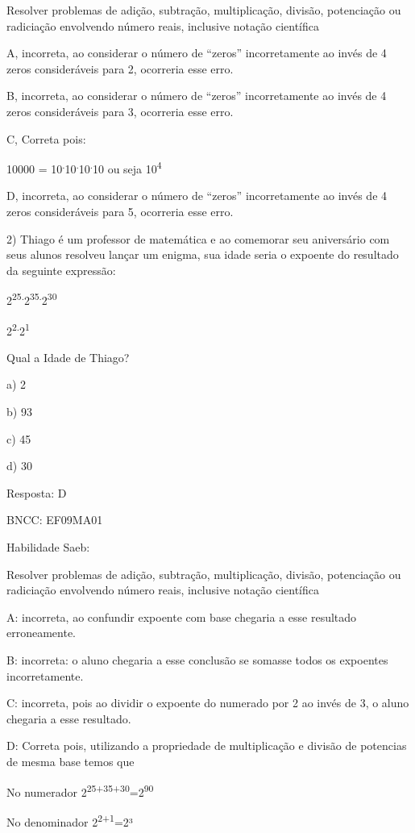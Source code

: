 Resolver problemas de adição, subtração, multiplicação, divisão,
potenciação ou radiciação envolvendo número reais, inclusive notação
científica

A, incorreta, ao considerar o número de ``zeros'' incorretamente ao
invés de 4 zeros consideráveis para 2, ocorreria esse erro.

B, incorreta, ao considerar o número de ``zeros'' incorretamente ao
invés de 4 zeros consideráveis para 3, ocorreria esse erro.

C, Correta pois:

10000 =
10\textsuperscript{.}10\textsuperscript{.}10\textsuperscript{.}10 ou
seja 10\textsuperscript{4}

D, incorreta, ao considerar o número de ``zeros'' incorretamente ao
invés de 4 zeros consideráveis para 5, ocorreria esse erro.

2) Thiago é um professor de matemática e ao comemorar seu aniversário
com seus alunos resolveu lançar um enigma, sua idade seria o expoente do
resultado da seguinte expressão:

2\textsuperscript{25.}2\textsuperscript{35.}2\textsuperscript{30}

2\textsuperscript{2.}2\textsuperscript{1}

Qual a Idade de Thiago?

a) 2

b) 93

c) 45

d) 30

Resposta: D

BNCC: EF09MA01

Habilidade Saeb:

Resolver problemas de adição, subtração, multiplicação, divisão,
potenciação ou radiciação envolvendo número reais, inclusive notação
científica

A: incorreta, ao confundir expoente com base chegaria a esse resultado
erroneamente.

B: incorreta: o aluno chegaria a esse conclusão se somasse todos os
expoentes incorretamente.

C: incorreta, pois ao dividir o expoente do numerado por 2 ao invés de
3, o aluno chegaria a esse resultado.

D: Correta pois, utilizando a propriedade de multiplicação e divisão de
potencias de mesma base temos que

No numerador 2\textsuperscript{25+35+30}=2\textsuperscript{90}

No denominador 2\textsuperscript{2+1}=2³

